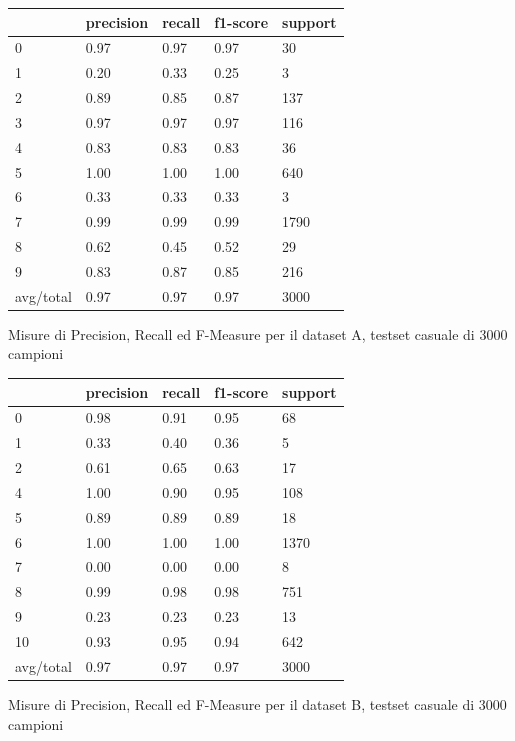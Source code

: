 \documentclass[10pt,a4paper]{article}
\begin{document}
	\begin{table}[!htbp]
    \scriptsize
    \centering
    	\begin{tabularx}{0.56\textwidth}{l | llll}
    		{} & {precision} & {recall} & {f1-score} & {support} \\
    		\midrule
            {0} & {0.97} & {0.97} & {0.97} & {30} \\
            {1} & {0.20} & {0.33} & {0.25} & {3} \\
            {2} & {0.89} & {0.85} & {0.87} & {137} \\
            {3} & {0.97} & {0.97} & {0.97} & {116} \\
            {4} & {0.83} & {0.83} & {0.83} & {36} \\
            {5} & {1.00} & {1.00} & {1.00} & {640} \\
            {6} & {0.33} & {0.33} & {0.33} & {3} \\
            {7} & {0.99} & {0.99} & {0.99} & {1790} \\
            {8} & {0.62} & {0.45} & {0.52} & {29} \\
            {9} & {0.83} & {0.87} & {0.85} & {216} \\
            {avg/total} & {0.97} & {0.97} & {0.97} & {3000} \\
    	\end{tabularx}
    	 {Misure di Precision, Recall ed F-Measure per il dataset A, testset casuale di 3000 campioni}
    	\label{tab:a_3ks}
    \end{table}

	\begin{table}[!htbp]
    \scriptsize
    \centering
    	\begin{tabularx}{0.56\textwidth}{l | llll}
    		{} & {precision} & {recall} & {f1-score} & {support} \\
    		\midrule
{0} & {0.98} & {0.91} & {0.95} & {68} \\
{1} & {0.33} & {0.40} & {0.36} & {5} \\
{2} & {0.61} & {0.65} & {0.63} & {17} \\
{4} & {1.00} & {0.90} & {0.95} & {108} \\
{5} & {0.89} & {0.89} & {0.89} & {18} \\
{6} & {1.00} & {1.00} & {1.00} & {1370} \\
{7} & {0.00} & {0.00} & {0.00} & {8} \\
{8} & {0.99} & {0.98} & {0.98} & {751} \\
{9} & {0.23} & {0.23} & {0.23} & {13} \\
{10} & {0.93} & {0.95} & {0.94} & {642} \\
{avg/total} & {0.97} & {0.97} & {0.97} & {3000} \\
    	\end{tabularx}
    	 {Misure di Precision, Recall ed F-Measure per il dataset B, testset casuale di 3000 campioni}
    	\label{tab:b_3ks}
    \end{table}
\end{document}
